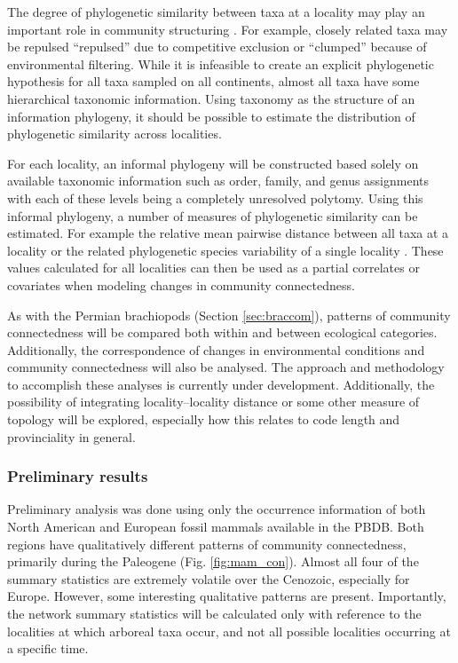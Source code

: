 \documentclass[12pt,letterpaper]{article}
\begin{document}
The degree of phylogenetic similarity between taxa at a locality may play an important role in community structuring \citep{Webb2002}. For example, closely related taxa may be repulsed ``repulsed'' due to competitive exclusion or ``clumped'' because of environmental filtering. While it is infeasible to create an explicit phylogenetic hypothesis for all taxa sampled on all continents, almost all taxa have some hierarchical taxonomic information. Using taxonomy as the structure of an information phylogeny, it should be possible to estimate the distribution of phylogenetic similarity across localities.

For each locality, an informal phylogeny will be constructed based solely on available taxonomic information such as order, family, and genus assignments with each of these levels being a completely unresolved polytomy. Using this informal phylogeny, a number of measures of phylogenetic similarity can be estimated. For example the relative mean pairwise distance between all taxa at a locality \citep{Webb2002} or the related phylogenetic species variability of a single locality \citep{Helmus2007a}. These values calculated for all localities can then be used as a partial correlates or covariates when modeling changes in community connectedness.

As with the Permian brachiopods (Section \ref{sec:braccom}), patterns of community connectedness will be compared both within and between ecological categories. Additionally, the correspondence of changes in environmental conditions and community connectedness will also be analysed. The approach and methodology to accomplish these analyses is currently under development. Additionally, the possibility of integrating locality--locality distance or some other measure of topology will be explored, especially how this relates to code length and provinciality in general.


\subsubsection{Preliminary results} \label{mamcomres}
Preliminary analysis was done using only the occurrence information of both North American and European fossil mammals available in the PBDB. Both regions have qualitatively different patterns of community connectedness, primarily during the Paleogene (Fig. \ref{fig:mam_con}). Almost all four of the summary statistics are extremely volatile over the Cenozoic, especially for Europe. However, some interesting qualitative patterns are present. Importantly, the network summary statistics will be calculated only with reference to the localities at which arboreal taxa occur, and not all possible localities occurring at a specific time.
\end{document}
